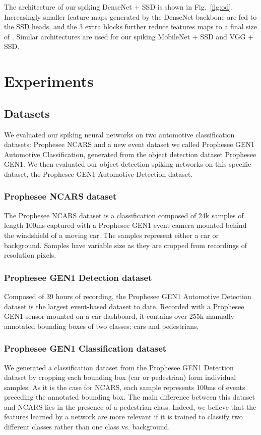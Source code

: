 \documentclass[conference]{IEEEtran}
\begin{document}
The architecture of our spiking DenseNet + SSD is shown in Fig.~\ref{fig:od}. Increasingly smaller feature maps generated by the DenseNet backbone are fed to the SSD heads, and the 3 extra blocks further reduce features maps to a final size of . Similar architectures are used for our spiking MobileNet + SSD and VGG + SSD.


\section{Experiments}

\subsection{Datasets}

We evaluated our spiking neural networks on two automotive classification datasets: Prophesee NCARS and a new event dataset we called Prophesee GEN1 Automotive Classification, generated from the object detection dataset Prophesee GEN1. We then evaluated our object detection spiking networks on this specific dataset, the Prophesee GEN1 Automotive Detection dataset.

\subsubsection{Prophesee NCARS dataset} 
The Prophesee NCARS dataset \cite{ncars} is a classification composed of 24k samples of length 100ms captured with a Prophesee GEN1 event camera mounted behind the windshield of a moving car. The samples represent either a car or background. Samples have variable size as they are cropped from recordings of resolution  pixels.

\subsubsection{Prophesee GEN1 Detection dataset} 
Composed of 39 hours of recording, the Prophesee GEN1 Automotive Detection dataset \cite{gen1} is the largest event-based dataset to date. Recorded with a Prophesee GEN1 sensor mounted on a car dashboard, it contains over 255k manually annotated bounding boxes of two classes: cars and pedestrians.

\subsubsection{Prophesee GEN1 Classification dataset} 
We generated a classification dataset from the Prophesee GEN1 Detection dataset by cropping each bounding box (car or pedestrian) form individual samples. As it is the case for NCARS, each sample represents 100ms of events preceding the annotated bounding box. The main difference between this dataset and NCARS lies in the presence of a pedestrian class. Indeed, we believe that the features learned by a network are more relevant if it is trained to classify two different classes rather than one class vs. background. 
\end{document}
